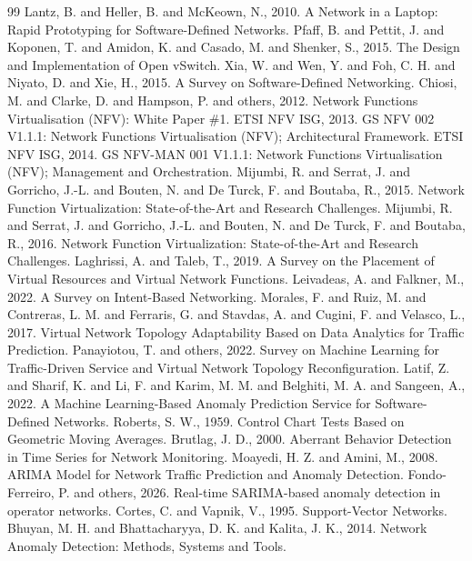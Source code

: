 \documentclass[12pt,a4paper]{article}
\begin{document}
\begin{thebibliography}{99}
 Lantz, B. and Heller, B. and McKeown, N., 2010. A Network in a Laptop: Rapid Prototyping for Software-Defined Networks.
 Pfaff, B. and Pettit, J. and Koponen, T. and Amidon, K. and Casado, M. and Shenker, S., 2015. The Design and Implementation of Open vSwitch.
 Xia, W. and Wen, Y. and Foh, C. H. and Niyato, D. and Xie, H., 2015. A Survey on Software-Defined Networking.
 Chiosi, M. and Clarke, D. and Hampson, P. and others, 2012. Network Functions Virtualisation (NFV): White Paper \#1.
 ETSI NFV ISG, 2013. GS NFV 002 V1.1.1: Network Functions Virtualisation (NFV); Architectural Framework.
 ETSI NFV ISG, 2014. GS NFV-MAN 001 V1.1.1: Network Functions Virtualisation (NFV); Management and Orchestration.
 Mijumbi, R. and Serrat, J. and Gorricho, J.-L. and Bouten, N. and De Turck, F. and Boutaba, R., 2015. Network Function Virtualization: State-of-the-Art and Research Challenges.
 Mijumbi, R. and Serrat, J. and Gorricho, J.-L. and Bouten, N. and De Turck, F. and Boutaba, R., 2016. Network Function Virtualization: State-of-the-Art and Research Challenges.
 Laghrissi, A. and Taleb, T., 2019. A Survey on the Placement of Virtual Resources and Virtual Network Functions.
 Leivadeas, A. and Falkner, M., 2022. A Survey on Intent-Based Networking.
 Morales, F. and Ruiz, M. and Contreras, L. M. and Ferraris, G. and Stavdas, A. and Cugini, F. and Velasco, L., 2017. Virtual Network Topology Adaptability Based on Data Analytics for Traffic Prediction.
 Panayiotou, T. and others, 2022. Survey on Machine Learning for Traffic-Driven Service and Virtual Network Topology Reconfiguration.
 Latif, Z. and Sharif, K. and Li, F. and Karim, M. M. and Belghiti, M. A. and Sangeen, A., 2022. A Machine Learning-Based Anomaly Prediction Service for Software-Defined Networks.
 Roberts, S. W., 1959. Control Chart Tests Based on Geometric Moving Averages.
 Brutlag, J. D., 2000. Aberrant Behavior Detection in Time Series for Network Monitoring.
 Moayedi, H. Z. and Amini, M., 2008. ARIMA Model for Network Traffic Prediction and Anomaly Detection.
 Fondo-Ferreiro, P. and others, 2026. Real-time SARIMA-based anomaly detection in operator networks.
 Cortes, C. and Vapnik, V., 1995. Support-Vector Networks.
 Bhuyan, M. H. and Bhattacharyya, D. K. and Kalita, J. K., 2014. Network Anomaly Detection: Methods, Systems and Tools.

\end{thebibliography}
\end{document}
